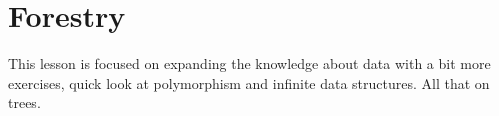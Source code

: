 \section{Forestry}
\label{sec:mff-forestry}
This lesson is focused on expanding the knowledge about data with a bit more
exercises, quick look at polymorphism and infinite data structures. All that on
trees.
